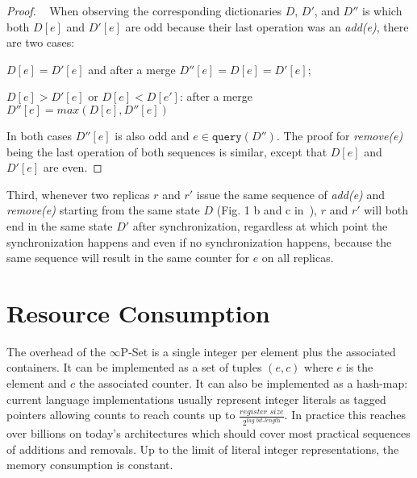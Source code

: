 \documentclass[10pt, oneside]{article}   	%
\begin{document}
\begin{proof}


	\pf~ When observing the corresponding dictionaries $D$, $D'$, and $D''$ is which both $D[e]$ and $D'[e]$ are odd because their last operation was an \textit{add(e)}, there are two cases:
	\begin{pfenum}
    		\item $D[e]=D'[e]$ and after a merge $D''[e]=D[e]=D'[e]$;
    		\item $D[e]>D'[e]$ or $D[e]<D[e']$: after a merge $D''[e]=max(D[e], D''[e])$
	\end{pfenum}   

	In both cases $D''[e]$ is also odd and $e \in  \texttt{query}(D'')$.  The proof for \textit{remove(e)} being the last operation of both sequences is similar, except that $D[e]$ and $D'[e]$ are even.

\end{proof}

Third, whenever two replicas $r$ and $r'$ issue the same sequence of \textit{add(e)} and \textit{remove(e)} starting from the same state $D$ (Fig. 1 b and c in~\cite{bieniusa:hal-00769554}), $r$ and $r'$ will both end in the same state $D'$ after synchronization, regardless at which point the synchronization happens and even if no synchronization happens, because the same sequence will result in the same counter for $e$ on all replicas.

\section{Resource Consumption}
\label{sec:resource-consumption}

The overhead of the $\infty$P-Set is a single integer per element plus the associated containers. It can be implemented as a set of tuples $(e,c)$ where $e$ is the element and $c$ the associated counter. It can also be implemented as a hash-map: current language implementations usually represent integer literals as tagged pointers allowing counts to reach counts up to 
$\frac{\textit{register size}}{2^\textit{tag bit-length}}$. In practice this reaches over billions on today's architectures which should cover most practical sequences of additions and removals. Up to the limit of literal integer representations, the memory consumption is constant.
\end{document}
